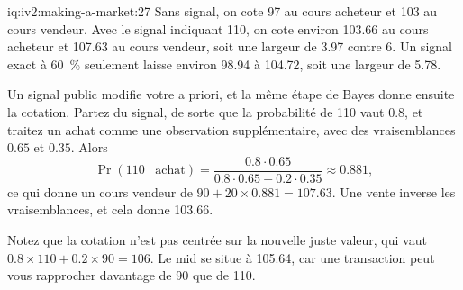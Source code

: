 \begin{solution}{iq:iv2:making-a-market:27}
Sans signal, on cote 97 au cours acheteur et 103 au cours vendeur. Avec le signal indiquant 110, on cote environ 103.66 au cours acheteur et 107.63 au cours vendeur, soit une largeur de 3.97 contre 6. Un signal exact à 60~\% seulement laisse environ 98.94 à 104.72, soit une largeur de 5.78.

Un signal public modifie votre a priori, et la même étape de Bayes donne ensuite la cotation. Partez du signal, de sorte que la probabilité de 110 vaut 0.8, et traitez un achat comme une observation supplémentaire, avec des vraisemblances $0.65$ et $0.35$. Alors
\[
\Pr(110 \mid \text{achat}) = \frac{0.8 \cdot 0.65}{0.8 \cdot 0.65 + 0.2 \cdot 0.35} \approx 0.881,
\]
ce qui donne un cours vendeur de $90 + 20 \times 0.881 = 107.63$. Une vente inverse les vraisemblances, et cela donne 103.66.

Notez que la cotation n'est pas centrée sur la nouvelle juste valeur, qui vaut $0.8 \times 110 + 0.2 \times 90 = 106$. Le mid se situe à 105.64, car une transaction peut vous rapprocher davantage de 90 que de 110.

\end{solution}

